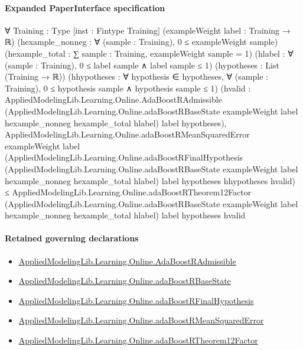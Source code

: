 \documentclass[10pt]{article}
\begin{document}
\paragraph{Expanded PaperInterface specification}
\begin{ReviewVerbatim}
∀ {Training : Type} [inst : Fintype Training] (exampleWeight label : Training → ℝ)
  (hexample_nonneg : ∀ (sample : Training), 0 ≤ exampleWeight sample)
  (hexample_total : ∑ sample : Training, exampleWeight sample = 1)
  (hlabel : ∀ (sample : Training), 0 ≤ label sample ∧ label sample ≤ 1) (hypotheses : List (Training → ℝ))
  (hhypotheses : ∀ hypothesis ∈ hypotheses, ∀ (sample : Training), 0 ≤ hypothesis sample ∧ hypothesis sample ≤ 1)
  (hvalid :
    AppliedModelingLib.Learning.Online.AdaBoostRAdmissible
      (AppliedModelingLib.Learning.Online.adaBoostRBaseState exampleWeight label hexample_nonneg hexample_total hlabel)
      label hypotheses),
  AppliedModelingLib.Learning.Online.adaBoostRMeanSquaredError exampleWeight label
      (AppliedModelingLib.Learning.Online.adaBoostRFinalHypothesis
        (AppliedModelingLib.Learning.Online.adaBoostRBaseState exampleWeight label hexample_nonneg hexample_total
          hlabel)
        label hypotheses hhypotheses hvalid) ≤
    AppliedModelingLib.Learning.Online.adaBoostRTheorem12Factor
      (AppliedModelingLib.Learning.Online.adaBoostRBaseState exampleWeight label hexample_nonneg hexample_total hlabel)
      label hypotheses hvalid
\end{ReviewVerbatim}

\paragraph{Retained governing declarations}
\begin{itemize}\raggedright
\item \hyperlink{library-prerequisite-629f39db1994b79f}{Applied\allowbreak{}Modeling\allowbreak{}Lib.\allowbreak{}Learning.\allowbreak{}Online.\allowbreak{}Ada\allowbreak{}Boost\allowbreak{}R\allowbreak{}Admissible}
\item \hyperlink{governing-declaration-a7b74e51f20c9637}{Applied\allowbreak{}Modeling\allowbreak{}Lib.\allowbreak{}Learning.\allowbreak{}Online.\allowbreak{}ada\allowbreak{}Boost\allowbreak{}R\allowbreak{}Base\allowbreak{}State}
\item \hyperlink{governing-declaration-62eebf8082142d98}{Applied\allowbreak{}Modeling\allowbreak{}Lib.\allowbreak{}Learning.\allowbreak{}Online.\allowbreak{}ada\allowbreak{}Boost\allowbreak{}R\allowbreak{}Final\allowbreak{}Hypothesis}
\item \hyperlink{governing-declaration-40d83f48f207f26f}{Applied\allowbreak{}Modeling\allowbreak{}Lib.\allowbreak{}Learning.\allowbreak{}Online.\allowbreak{}ada\allowbreak{}Boost\allowbreak{}R\allowbreak{}Mean\allowbreak{}Squared\allowbreak{}Error}
\item \hyperlink{governing-declaration-e3906f1e7351fa4e}{Applied\allowbreak{}Modeling\allowbreak{}Lib.\allowbreak{}Learning.\allowbreak{}Online.\allowbreak{}ada\allowbreak{}Boost\allowbreak{}R\allowbreak{}Theorem12\allowbreak{}Factor}
\end{itemize}
\end{document}
